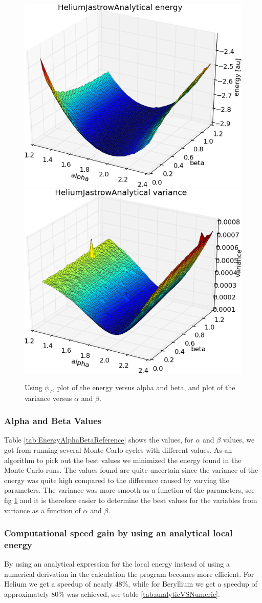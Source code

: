 		\begin{figure}
			\centering \includegraphics[width=0.49\linewidth]{../figures/HeliumJastrowAnalytical_alpha_beta_energy}
			\includegraphics[width=0.49\linewidth]{../figures/HeliumJastrowAnalytical_alpha_beta_variance}
			\protect\caption{Using $\psi_{T}$, plot of the energy versus alpha and beta, and plot of the variance versus $\alpha$ and $\beta$. }
			\label{fig:HeliumAlphaBeta}
		\end{figure}


		\subsubsection{Alpha and Beta Values}

			Table \ref{tab:EnergyAlphaBetaReference} shows the values, for \(\alpha\) and \(\beta\) values, we got from  running several Monte Carlo cycles with different values. As an algorithm to pick out the best values we minimized the energy found in the Monte Carlo runs. The values found are quite uncertain since the variance of the energy was quite high compared to the difference caused by varying the parameters. The variance was more smooth as a function of the parameters, see fig \ref{fig:HeliumAlphaBeta} and it is therefore easier to determine the best values for the variables from variance as a function of \(\alpha\) and \(\beta\).




		\subsubsection{Computational speed gain by using an analytical local energy}
			By using an analytical expression for the local energy instead of using a numerical derivation in the calculation the program becomes more efficient. For Helium we get a speedup of nearly 48\%, while for Beryllium we get a speedup of approximately 80\% was achieved, see table \ref{tab:analyticVSNumeric}.

